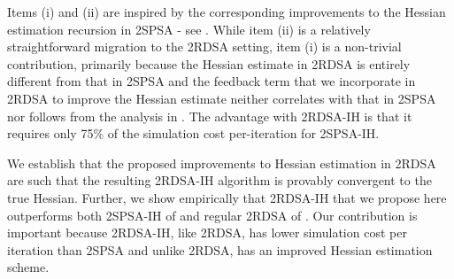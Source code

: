 \documentclass[twocolumn]{IEEEtran}
\begin{document}
Items (i) and (ii) are inspired by the corresponding improvements to the Hessian estimation recursion in 2SPSA - see \cite{spall-jacobian}. While item (ii) is a relatively straightforward migration to the 2RDSA setting, item (i) is a non-trivial contribution, primarily because the Hessian estimate in 2RDSA is entirely different from that in 2SPSA and the feedback term that we incorporate in 2RDSA to improve the Hessian estimate neither correlates with that in 2SPSA nor follows from the analysis in \cite{spall-jacobian}. 
The advantage with 2RDSA-IH is that it requires only 75\% of the simulation cost per-iteration for 2SPSA-IH. 

We establish that the proposed improvements to Hessian estimation in 2RDSA are such  that the resulting 2RDSA-IH algorithm is provably convergent to the true Hessian. 
Further, we show empirically that 2RDSA-IH that we propose here outperforms both 2SPSA-IH of \cite{spall-jacobian} and regular 2RDSA of \cite{prashanth2015rdsa}. Our contribution is important because 2RDSA-IH, like 2RDSA, has lower simulation cost per iteration than 2SPSA and unlike 2RDSA, has an improved Hessian estimation scheme.

\end{document}
